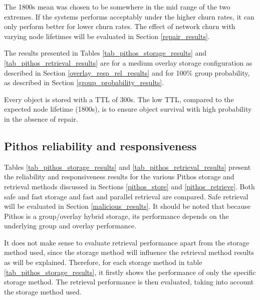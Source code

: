 The 1800s mean was chosen to be somewhere in the mid range of the two extremes. If the systems performs acceptably under the higher churn rates, it can only perform better for lower churn rates. The effect of network churn with varying node lifetimes will be evaluated in Section \ref{repair_results}.

The results presented in Tables \ref{tab_pithos_storage_results} and \ref{tab_pithos_retrieval_results} are for a medium overlay storage configuration as described in Section \ref{overlay_resp_rel_results} and for 100\% group probability, as described in Section \ref{group_probability_results}.

Every object is stored with a TTL of 300s. The low TTL, compared to the expected node lifetime (1800s), is to ensure object survival with high probability in the absence of repair.

\subsection{Pithos reliability and responsiveness}
\label{pithos_resp_rel_results}

Tables \ref{tab_pithos_storage_results} and \ref{tab_pithos_retrieval_results} present the reliability and responsiveness results for the various Pithos storage and retrieval methods discussed in Sections \ref{pithos_store} and \ref{pithos_retrieve}. Both safe and fast storage and fast and parallel retrieval are compared. Safe retrieval will be evaluated in Section \ref{malicious_results}. It should be noted that because Pithos is a group/overlay hybrid storage, its performance depends on the underlying group and overlay performance.

It does not make sense to evaluate retrieval performance apart from the storage method used, since the storage method will influence the retrieval method results as will be explained. Therefore, for each storage method in table \ref{tab_pithos_storage_results}, it firstly shows the performance of only the specific storage method. The retrieval performance is then evaluated, taking into account the storage method used.

